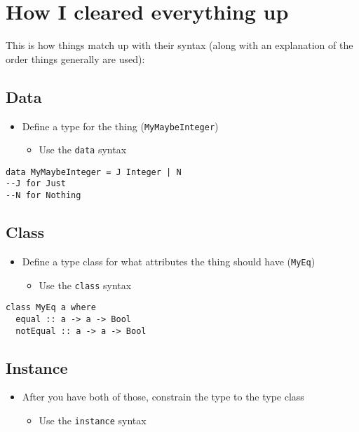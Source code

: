 \documentclass[12pt]{article}
\newcommand{\tightlist}{\setlength{\itemsep}{0pt}\setlength{\parskip}{0pt}}
\begin{document}
\section{How I cleared everything
up}\label{how-i-cleared-everything-up}

This is how things match up with their syntax (along with an explanation
of the order things generally are used):

\subsection{Data}

\begin{itemize}
\tightlist
\item
  Define a type for the thing (\texttt{MyMaybeInteger})
  \begin{itemize}
    \item
      Use the \texttt{data} syntax
  \end{itemize}
\end{itemize}

\begin{lstlisting} 
data MyMaybeInteger = J Integer | N
--J for Just 
--N for Nothing 
\end{lstlisting}

\subsection{Class}

\begin{itemize}
\tightlist
\item
  Define a type class for what attributes the thing should have
  (\texttt{MyEq})
  \begin{itemize}
    \item
      Use the \texttt{class} syntax
  \end{itemize}
\end{itemize}

\begin{lstlisting} 
class MyEq a where 
  equal :: a -> a -> Bool 
  notEqual :: a -> a -> Bool 
\end{lstlisting}

\subsection{Instance}

\begin{itemize}
\tightlist
\item
  After you have both of those, constrain the type to the type class
  \begin{itemize}
    \item
      Use the \texttt{instance} syntax
  \end{itemize}
\end{itemize}
\end{document}
